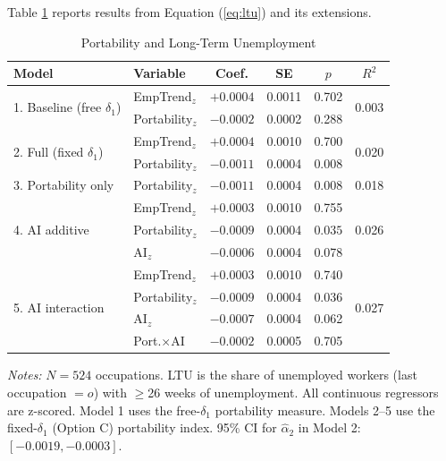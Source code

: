 \documentclass[12pt]{article}
\begin{document}
Table \ref{tab:ltu} reports results from Equation (\ref{eq:ltu}) and its extensions.

\begin{table}[H]
\centering
\caption{Portability and Long-Term Unemployment}
\label{tab:ltu}
\begin{tabular}{llcccc}
\toprule
\textbf{Model} & \textbf{Variable} & \textbf{Coef.} & \textbf{SE} & \textbf{$p$} & \textbf{$R^2$} \\
\midrule
\multirow{2}{*}{1. Baseline (free $\delta_1$)} & EmpTrend$_z$ & $+0.0004$ & 0.0011 & 0.702 & \multirow{2}{*}{0.003} \\
 & Portability$_z$ & $-0.0002$ & 0.0002 & 0.288 & \\
\midrule
\multirow{2}{*}{2. Full (fixed $\delta_1$)} & EmpTrend$_z$ & $+0.0004$ & 0.0010 & 0.700 & \multirow{2}{*}{0.020} \\
 & Portability$_z$ & $\mathbf{-0.0011}$ & 0.0004 & $\mathbf{0.008}$ & \\
\midrule
3. Portability only & Portability$_z$ & $-0.0011$ & 0.0004 & 0.008 & 0.018 \\
\midrule
\multirow{3}{*}{4. AI additive} & EmpTrend$_z$ & $+0.0003$ & 0.0010 & 0.755 & \multirow{3}{*}{0.026} \\
 & Portability$_z$ & $\mathbf{-0.0009}$ & 0.0004 & $\mathbf{0.035}$ & \\
 & AI$_z$ & $-0.0006$ & 0.0004 & 0.078 & \\
\midrule
\multirow{4}{*}{5. AI interaction} & EmpTrend$_z$ & $+0.0003$ & 0.0010 & 0.740 & \multirow{4}{*}{0.027} \\
 & Portability$_z$ & $-0.0009$ & 0.0004 & 0.036 & \\
 & AI$_z$ & $-0.0007$ & 0.0004 & 0.062 & \\
 & Port.$\times$AI & $-0.0002$ & 0.0005 & 0.705 & \\
\bottomrule
\end{tabular}
\begin{minipage}{0.9\textwidth}
\vspace{0.5em}
\footnotesize \textit{Notes:} $N = 524$ occupations. LTU is the share of unemployed workers (last occupation $= o$) with $\geq$26 weeks of unemployment. All continuous regressors are z-scored. Model 1 uses the free-$\delta_1$ portability measure. Models 2--5 use the fixed-$\delta_1$ (Option C) portability index. 95\% CI for $\hat{\alpha}_2$ in Model 2: $[-0.0019, -0.0003]$.
\end{minipage}
\end{table}
\end{document}
